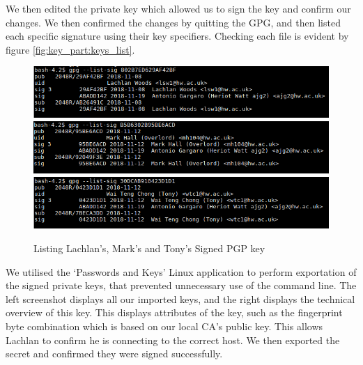 \noindent We then edited the private key which allowed us to sign the key and confirm our changes.
We then confirmed the changes by quitting the GPG, and then listed each specific signature using their key specifiers. Checking each file is evident by figure \ref{fig:key_part:keys_list}.

\begin{figure}[hbt!]
	\centering
      \includegraphics[width=\textwidth]{imgs/key_signing/lachlan_sign.png} \\
      \includegraphics[width=\textwidth]{imgs/key_signing/Mark_sign.png} \\
      \includegraphics[width=\textwidth]{imgs/key_signing/Tony_sign.png} \\
	\caption{Listing Lachlan's, Mark's and Tony's Signed PGP key}
	\label{fig:key_part:3_signed}
    \noindent\makebox[\linewidth]{}
\end{figure}

\noindent We utilised the `Passwords and Keys' Linux application to perform exportation of the signed private keys, that prevented unnecessary use of the command line. The left screenshot displays all our imported keys, and the right displays the technical overview of this key. This displays attributes of the key, such as the fingerprint byte combination which is based on our local CA's public key. This allows Lachlan to confirm he is connecting to the correct host. We then exported the secret and confirmed they were signed successfully.

